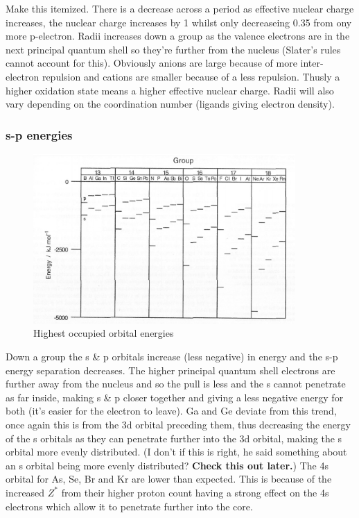 \documentclass{article}
\begin{document}
    Make this itemized.
    There is a decrease across a period as effective nuclear charge increases, the nuclear charge increases by 1
    whilst only decreaseing 0.35 from ony more p-electron. Radii increases down a group as the valence electrons
    are in the next principal quantum shell so they're further from the nucleus (Slater's rules cannot account
    for this). Obviously anions are large because of more inter-electron repulsion and cations are smaller because
    of a less repulsion. Thusly a higher oxidation state means a higher effective nuclear charge.
    Radii will also vary depending on the coordination number (ligands giving electron density).

    \subsubsection{s-p energies}

    \begin{figure}[h]
        \centering
        \includegraphics[width=10cm]{s-psep.jpg}
        \caption{Highest occupied orbital energies}
    \end{figure}

    Down a group the s \& p orbitals increase (less negative) in energy and the s-p energy separation decreases.
    The higher principal quantum shell electrons are further away from the nucleus and so the pull is less
    and the s cannot penetrate as far inside, making s \& p closer together and giving a less negative energy 
    for both (it's easier for the electron to leave). Ga and Ge deviate from this trend, once again
    this is from the 3d orbital preceding them, thus decreasing the energy of the s orbitals as they can penetrate
    further into the 3d orbital, making the s orbital more evenly distributed. (I don't if this is right, he said something about an s orbital being more evenly 
    distributed? \textbf{Check this out later.}) The 4s orbital for As, Se, Br and
    Kr are lower than expected. This is because of the increased \(Z^*\) from their higher proton count having a strong
    effect on the 4s electrons which allow it to penetrate further into the core.  
\end{document}
